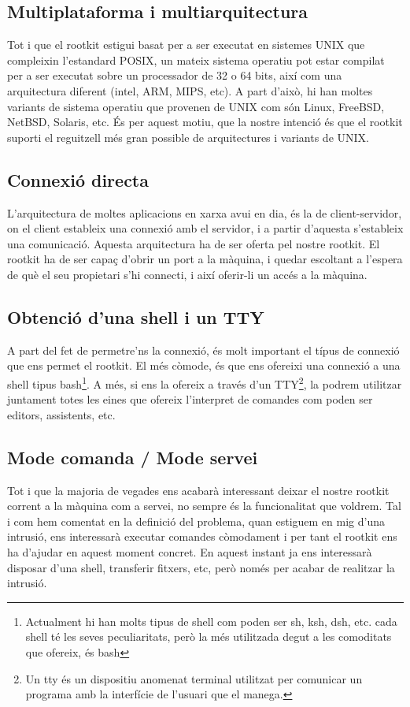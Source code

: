 \subsection{Multiplataforma i multiarquitectura}
Tot i que el rootkit estigui basat per a ser executat en sistemes UNIX que compleixin l'estandard POSIX, un mateix sistema 
operatiu pot estar compilat per a ser executat sobre un processador de 32 o 64 bits, així com una arquitectura diferent
(intel, ARM, MIPS, etc). A part d'això, hi han moltes variants de sistema operatiu que provenen de UNIX com són  Linux, 
FreeBSD, NetBSD, Solaris, etc. És per aquest motiu, que la nostre intenció és que el rootkit suporti el reguitzell més gran 
possible de arquitectures i variants de UNIX.

\subsection{Connexió directa}
L'arquitectura de moltes aplicacions en xarxa avui en dia, és la de client-servidor, on el client estableix una connexió
amb el servidor, i a partir d'aquesta s'estableix una comunicació. Aquesta arquitectura ha de ser oferta pel nostre rootkit. 
El rootkit ha de ser capaç d'obrir un port a la màquina, i quedar escoltant a l'espera de què el seu propietari s'hi connecti,
i així oferir-li un accés a la màquina.

\subsection{Obtenció d'una shell i un TTY}
A part del fet de permetre'ns la connexió, és molt important el típus de connexió que ens permet el rootkit. El més còmode, és que ens
ofereixi una connexió a una shell tipus bash\footnote{Actualment hi han molts tipus de shell com poden ser sh, ksh, dsh, etc. cada shell té les seves peculiaritats, però la més utilitzada degut a les comoditats que ofereix, és bash}. A més, si ens la ofereix a través d'un TTY\footnote{Un tty és un dispositiu anomenat terminal utilitzat per comunicar un programa amb la interfície de l'usuari que el manega.}, la podrem utilitzar juntament totes les eines
que ofereix l'interpret de comandes com poden ser editors, assistents, etc.

\subsection{Mode comanda / Mode servei}
Tot i que la majoria de vegades ens acabarà interessant deixar el nostre rootkit corrent a la màquina com a servei, no sempre
és la funcionalitat que voldrem. Tal i com hem comentat en la definició del problema, quan estiguem en mig d'una intrusió, ens interessarà
executar comandes còmodament i per tant el rootkit ens ha d'ajudar en aquest moment concret. En aquest instant ja ens interessarà 
disposar d'una shell, transferir fitxers, etc, però només per acabar de realitzar la intrusió.

